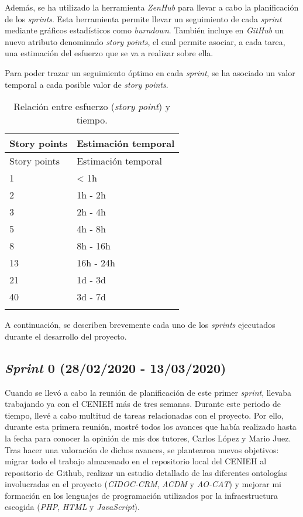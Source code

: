 Además, se ha utilizado la herramienta \emph{ZenHub} \cite{zenhub:web} para llevar a cabo
la planificación de los \emph{sprints}. Esta herramienta permite llevar
un seguimiento de cada \emph{sprint} mediante gráficos estadísticos como
\emph{burndown}. También incluye en \emph{GitHub} un nuevo atributo
denominado \emph{story points}, el cual permite asociar, a cada tarea,
una estimación del esfuerzo que se va a realizar sobre ella.

Para poder trazar un seguimiento óptimo en cada \emph{sprint}, se ha
asociado un valor temporal a cada posible valor de \emph{story points}.

\begin{longtable}[]{@{}ll@{}}
\tabularnewline
\toprule
Story points & Estimación temporal\tabularnewline
\midrule
\endfirsthead
\toprule
Story points & Estimación temporal\tabularnewline
\midrule
\endhead
1 & \textless{} 1h\tabularnewline
2 & 1h - 2h\tabularnewline
3 & 2h - 4h\tabularnewline
5 & 4h - 8h\tabularnewline
8 & 8h - 16h\tabularnewline
13 & 16h - 24h\tabularnewline
21 & 1d - 3d\tabularnewline
40 & 3d - 7d\tabularnewline
\bottomrule
\caption{Relación entre esfuerzo (\emph{story point}) y tiempo.}
\end{longtable}

A continuación, se describen brevemente cada uno de los \emph{sprints}
ejecutados durante el desarrollo del proyecto.

\subsection{\emph{Sprint} 0 (28/02/2020 - 13/03/2020)}

Cuando se llevó a cabo la reunión de planificación de este primer
\emph{sprint}, llevaba trabajando ya con el CENIEH más de tres semanas.
Durante este periodo de tiempo, llevé a cabo multitud de tareas
relacionadas con el proyecto. Por ello, durante esta primera reunión,
mostré todos los avances que había realizado hasta la fecha para conocer
la opinión de mis dos tutores, Carlos López y Mario Juez. Tras hacer una
valoración de dichos avances, se plantearon nuevos objetivos: migrar
todo el trabajo almacenado en el repositorio local del CENIEH al
repositorio de Github, realizar un estudio detallado de las diferentes
ontologías involucradas en el proyecto (\emph{CIDOC-CRM}, \emph{ACDM} y
\emph{AO-CAT}) y mejorar mi formación en los lenguajes de programación
utilizados por la infraestructura escogida (\emph{PHP}, \emph{HTML} y
\emph{JavaScript}).

